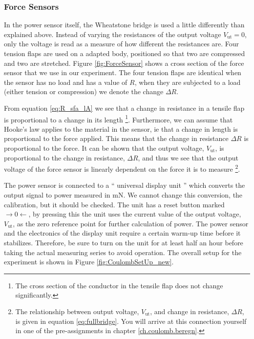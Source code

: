\documentclass[../Elmag-labhefte-2020.tex]{subfiles}
\begin{document}
\subsubsection{Force Sensors} \vspace{-5mm}
In the power sensor itself, the Wheatstone bridge is used a little differently than explained above. Instead of varying the resistances of the output voltage $V_\text{ut} = 0$, only the voltage is read as a measure of how different the resistances are. Four tension flaps are used on a adapted body, positioned so that two are compressed and two are stretched. Figure \ref{fig:ForceSensor} shows a cross section of the force sensor that we use in our experiment. The four tension flaps are identical when the sensor has no load and has a value of $R$, when they are subjected to a load (either tension or compression) we denote the change ${\Delta R}$.

From equation \eqref{eq:R_sfa_lA} we see that a change in resistance in a tensile flap is proportional to a change in its length \footnote{The cross section of the conductor in the tensile flap does not change significantly.}. Furthermore, we can assume that Hooke's law applies to the material in the sensor, ie that a change in length is proportional to the force applied. This means that the change in resistance $\Delta R$ is proportional to the force. It can be shown that the output voltage, $V_\text{ut}$, is proportional to the change in resistance, $\Delta R$, and thus we see that the output voltage of the force sensor is linearly dependent on the force it is to measure \footnote{The relationship between output voltage, $V_\text{ut}$, and change in resistance, $\Delta R$, is given in equation \eqref{eq:fullbridge}. You will arrive at this connection yourself in one of the pre-assignments in chapter \ref{ch.coulomb.beregn}.}.

The power sensor is connected to a `` universal display unit '' which converts the output signal to power measured in \si{\milli\newton}. We cannot change this conversion, the calibration, but it should be checked. The unit has a reset button marked $\rightarrow 0 \leftarrow$, by pressing this the unit uses the current value of the output voltage, $V_\text{ut}$, as the zero reference point for further calculation of power. The power sensor and the electronics of the display unit require a certain warm-up time before it stabilizes. Therefore, be sure to turn on the unit for at least half an hour before taking the actual measuring series to avoid operation. The overall setup for the experiment is shown in Figure \ref{fig:CoulombSetUp_new}.
\end{document}

